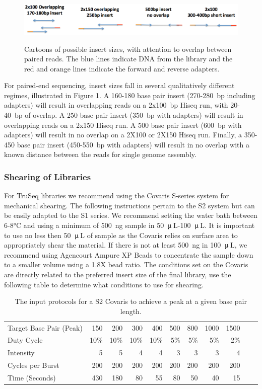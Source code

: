 \documentclass[graybox]{svmult}
\begin{document}
\begin{figure}[t]
\caption{Cartoons of possible insert sizes, with attention to overlap between paired reads.  The blue lines indicate DNA from the library and the red and orange lines indicate the forward and reverse adapters.}
\includegraphics[width=11.5cm]{imgs/image1.eps}
%
\label{fig:1}       %
\end{figure}

For paired-end sequencing, insert sizes fall in several qualitatively different regimes, illustrated in Figure 1.    A 160-180 base pair insert (270-280~bp including adapters) will result in overlapping reads on a 2x100~bp Hiseq run, with 20-40~bp of overlap.  A 250 base pair insert  (350~bp with adapters) will result in overlapping reads on a 2x150 Hiseq run. A 500 base pair insert (600~bp with adapters) will result in no overlap on a 2X100 or 2X150 Hiseq run. Finally, a 350-450 base pair insert (450-550~bp with adapters) will result in no overlap with a known distance between the reads for single genome assembly.

\subsubsection{Shearing of Libraries}

For TruSeq libraries we recommend using the Covaris S-series system for mechanical shearing. The following instructions pertain to the S2 system but can be easily adapted to the S1 series.  We recommend setting the water bath between 6-8°C and using a minimum of 500~ng sample in 50~$\umu$\,L-100~$\umu$\,L. It is important to use no less then 50~$\umu$\,L of sample as the Covaris relies on surface area to appropriately shear the material.  If there is not at least 500~ng in 100~$\umu$\,L, we recommend using Agencourt Ampure XP Beads to concentrate the sample down to a smaller volume using a 1.8X bead ratio.  The conditions set on the Covaris are directly related to the preferred insert size of the final library, use the following table to determine what conditions to use for shearing.

\begin{table}
\label{shearingtable}
\caption{The input protocols for a S2 Covaris to achieve a peak at a given base pair length.}
\begin{tabular}{lrrrrrrrrrr}
Target Base Pair (Peak) & 150 & 200 & 300 & 400 & 500 & 800 & 1000 & 1500  \\
Duty Cycle & 10\% & 10\% & 10\% & 10\% & 5\% & 5\% & 5\% & 2\%  \\
Intensity & 5 & 5 & 4 & 4 & 3 & 3 & 3 & 4  \\
Cycles per Burst & 200 & 200 & 200 & 200 & 200 & 200 & 200 & 200  \\
Time (Seconds) & 430 & 180 & 80 & 55 & 80 & 50 & 40 & 15  \\
\end{tabular}
\end{table}
\end{document}
